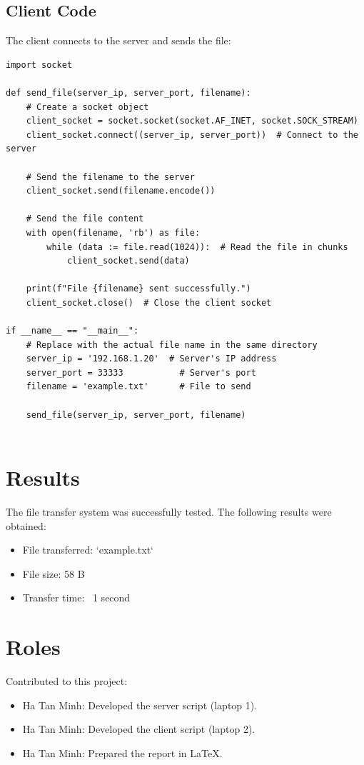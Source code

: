 \documentclass{article}
\begin{document}
\subsection{Client Code}
The client connects to the server and sends the file:
\begin{verbatim}
import socket

def send_file(server_ip, server_port, filename):
    # Create a socket object
    client_socket = socket.socket(socket.AF_INET, socket.SOCK_STREAM)
    client_socket.connect((server_ip, server_port))  # Connect to the server

    # Send the filename to the server
    client_socket.send(filename.encode())

    # Send the file content
    with open(filename, 'rb') as file:
        while (data := file.read(1024)):  # Read the file in chunks
            client_socket.send(data)

    print(f"File {filename} sent successfully.")
    client_socket.close()  # Close the client socket

if __name__ == "__main__":
    # Replace with the actual file name in the same directory
    server_ip = '192.168.1.20'  # Server's IP address
    server_port = 33333           # Server's port
    filename = 'example.txt'      # File to send

    send_file(server_ip, server_port, filename)


\end{verbatim}

\section{Results}
The file transfer system was successfully tested. The following results were obtained:
\begin{itemize}
    \item File transferred: `example.txt`
    \item File size: 58 B
    \item Transfer time: ~1 second
\end{itemize}

\section{Roles}
Contributed to this project:
\begin{itemize}
    \item Ha Tan Minh: Developed the server script (laptop 1).
    \item Ha Tan Minh: Developed the client script (laptop 2).
    \item Ha Tan Minh: Prepared the report in LaTeX.
\end{itemize}
\end{document}
